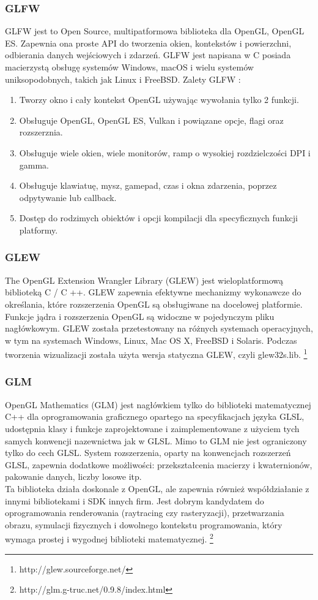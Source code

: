 \subsubsection{GLFW} 
GLFW jest to Open Source, multipatformowa biblioteka dla OpenGL, OpenGL ES. Zapewnia ona proste API do tworzenia okien, kontekstów i powierzchni, odbierania danych wejściowych i zdarzeń. GLFW jest napisana w C posiada macierzystą obsługę systemów Windows, macOS i wielu systemów uniksopodobnych, takich jak Linux i FreeBSD. 
Zalety GLFW :
\begin{enumerate}
\item Tworzy okno i cały kontekst OpenGL używając wywołania tylko 2 funkcji.
\item Obsługuje OpenGL, OpenGL ES, Vulkan i powiązane opcje, flagi oraz rozszerznia.
\item Obsługuje wiele okien, wiele monitorów, ramp o wysokiej rozdzielczości DPI i gamma.
\item Obsługuje klawiatuę, mysz, gamepad, czas i okna zdarzenia, poprzez odpytywanie lub callback.
\item Dostęp do rodzimych obiektów i opcji kompilacji dla specyficznych funkcji platformy.
\end{enumerate} 

\subsubsection{GLEW}
The OpenGL Extension Wrangler Library (GLEW) jest wieloplatformową biblioteką C / C ++. GLEW zapewnia efektywne mechanizmy wykonawcze do określania, które rozszerzenia OpenGL są obsługiwane na docelowej platformie. Funkcje jądra i rozszerzenia OpenGL są widoczne w pojedynczym pliku nagłówkowym. GLEW została przetestowany na różnych systemach operacyjnych, w tym na systemach Windows, Linux, Mac OS X, FreeBSD i Solaris.
Podczas tworzenia wizualizacji została użyta wersja statyczna GLEW, czyli glew32s.lib. \footnote{http://glew.sourceforge.net/}

\subsubsection{GLM}
OpenGL Mathematics (GLM) jest nagłówkiem tylko do biblioteki matematycznej C++ dla oprogramowania graficznego opartego na specyfikacjach języka GLSL, udostępnia klasy i funkcje zaprojektowane i zaimplementowane z użyciem tych samych konwencji nazewnictwa jak w GLSL. Mimo to GLM nie jest ograniczony tylko do cech GLSL. System rozszerzenia, oparty na konwencjach rozszerzeń GLSL, zapewnia dodatkowe możliwości: przekształcenia macierzy i kwaternionów, pakowanie danych, liczby losowe itp. \\
Ta biblioteka działa doskonale z OpenGL, ale zapewnia również współdziałanie z innymi bibliotekami i SDK innych firm. Jest dobrym kandydatem do oprogramowania renderowania (raytracing czy rasteryzacji), przetwarzania obrazu, symulacji fizycznych i dowolnego kontekstu programowania, który wymaga prostej i wygodnej biblioteki matematycznej. 
\footnote{http://glm.g-truc.net/0.9.8/index.html}

